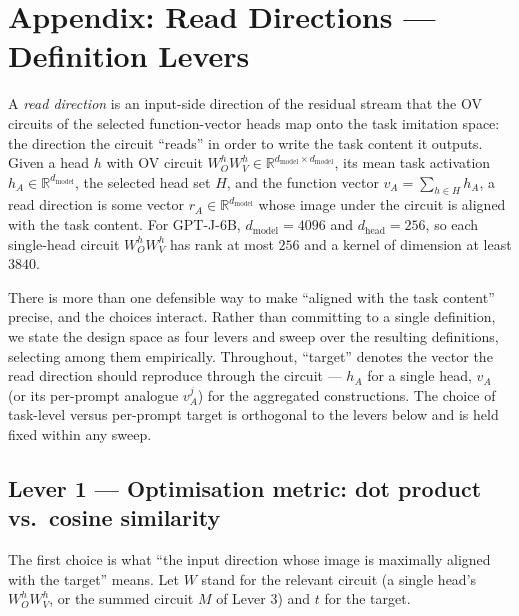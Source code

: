 \documentclass[
]{article}
\author{}
\date{}
\newcommand{\dmodel}{d_{\mathrm{model}}}
\newcommand{\dhead}{d_{\mathrm{head}}}
\begin{document}
\section{Appendix: Read Directions — Definition Levers}\label{read-direction-levers}

A \emph{read direction} is an input-side direction of the residual stream that the OV
circuits of the selected function-vector heads map onto the task imitation space: the
direction the circuit ``reads'' in order to write the task content it outputs. Given a
head $h$ with OV circuit $W^h_O W^h_V \in \mathbb{R}^{\dmodel \times \dmodel}$, its mean
task activation $h_A \in \mathbb{R}^{\dmodel}$, the selected head set $H$, and the
function vector $v_A = \sum_{h \in H} h_A$, a read direction is some vector
$r_A \in \mathbb{R}^{\dmodel}$ whose image under the circuit is aligned with the task
content. For GPT-J-6B, $\dmodel = 4096$ and $\dhead = 256$, so each single-head circuit
$W^h_O W^h_V$ has rank at most $256$ and a kernel of dimension at least $3840$.

There is more than one defensible way to make ``aligned with the task content'' precise,
and the choices interact. Rather than committing to a single definition, we state the
design space as four levers and sweep over the resulting definitions, selecting among
them empirically. Throughout, ``target'' denotes the vector the read direction should
reproduce through the circuit --- $h_A$ for a single head, $v_A$ (or its per-prompt
analogue $v^j_A$) for the aggregated constructions. The choice of task-level versus
per-prompt target is orthogonal to the levers below and is held fixed within any sweep.

\subsection{Lever 1 — Optimisation metric: dot product vs.\ cosine
similarity}\label{lever-1-metric}

The first choice is what ``the input direction whose image is maximally aligned with the
target'' means. Let $W$ stand for the relevant circuit (a single head's $W^h_O W^h_V$,
or the summed circuit $M$ of Lever 3) and $t$ for the target.
\end{document}
